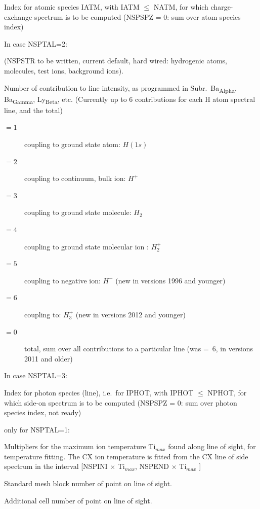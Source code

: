 \begin{description}
        Index for atomic species IATM, with IATM $\leq$ NATM, for which charge-exchange
        spectrum is to be computed (NSPSPZ = 0: sum over atom species index)

        In case NSPTAL=2:

        (NSPSTR to be written, current default, hard wired: hydrogenic atoms,
        molecules, test ions, background ions).

        Number of contribution to line intensity, as programmed in Subr.\
        Ba\textsubscript{Alpha}, Ba\textsubscript{Gamma}, Ly\textsubscript{Beta}, etc.
        (Currently up to 6 contributions for each H atom spectral line, and the total)
        \begin{description}
          \item[$= 1$] coupling to ground state atom: $H(1s)$
          \item[$= 2$] coupling to continuum, bulk ion: $H^+$
          \item[$= 3$] coupling to
                ground state molecule: $H_2$
          \item[$= 4$] coupling to ground state molecular
                ion : $H_2^+$
          \item[$= 5$] coupling to negative ion: $H^-$ (new in versions
                1996 and younger)
          \item[$= 6$] coupling to: $H_3^+$  (new in versions 2012 and
                younger)
          \item[$= 0$] total, sum over all contributions to a particular line
                (was =~6, in versions 2011 and older)
        \end{description}

        In case NSPTAL=3:

        Index for photon species (line), i.e.\ for IPHOT, with IPHOT $\leq$ NPHOT, for
        which side-on spectrum is to be computed (NSPSPZ = 0: sum over photon species
        index, not ready)
  \item[NSPINI, NSPEND] only for NSPTAL=1:

        Multipliers for the maximum ion temperature Ti$_{max}$ found along line of
        sight, for temperature fitting.
        The CX ion temperature	is fitted from the CX line of side spectrum in the
        interval [NSPINI $\times$ Ti$_{max}$, NSPEND $\times$ Ti$_{max}$ ]

  \item[NSPBLC] Standard mesh block number of  point on line of
        sight.
  \item[NSPADD] Additional cell number of  point on line of sight.


\end{description}

